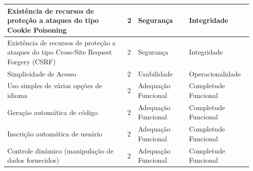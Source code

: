 \begin{apendicesenv}
\begin{longtable}{|p{175pt}|p{18pt}|p{110pt}|p{120pt}|}
 {\raggedright {Existência de recursos de proteção a ataques do tipo Cookie Poisoning}}
  	 	 & {\raggedright {2}}
  	 	 & {\raggedright {Segurança}}
  	 	 & {\raggedright {Integridade}}\\
  	 	\hline
{\raggedright {Existência de recursos de proteção a ataques do tipo Cross-Site Request Forgery (CSRF)}}
  	 	 & {\raggedright {2}}
  	 	 & {\raggedright {Segurança}}
  	 	 & {\raggedright {Integridade}}\\
  	 	\hline
{\raggedright {Simplicidade de Acesso}}
  	 	 & {\raggedright {2}}
  	 	 & {\raggedright {Usabilidade}}
  	 	 & {\raggedright {Operacionalidade}}\\
  	 	\hline
{\raggedright {Uso simples de várias opções de idioma}}
  	 	 & {\raggedright {2}}
  	 	 & {\raggedright {Adequação Funcional}}
  	 	 & {\raggedright {Completude Funcional}}\\
  	 	\hline
 {\raggedright {Geração automática de código}}
  	 	 & {\raggedright {2}}
  	 	 & {\raggedright {Adequação Funcional}}
  	 	 & {\raggedright {Completude Funcional}}\\
  	 	\hline
 {\raggedright {Inscrição automática de usuário}}
  	 	 & {\raggedright {2}}
  	 	 & {\raggedright {Adequação Funcional}}
  	 	 & {\raggedright {Completude Funcional}}\\
  	 	\hline
{\raggedright {Controle dinâmico (manipulação de dados fornecidos)}}
  	 	 & {\raggedright {2}}
  	 	 & {\raggedright {Adequação Funcional}}
  	 	 & {\raggedright {Completude Funcional}}\\
  	 	\hline
 

\end{longtable}
\end{apendicesenv}
